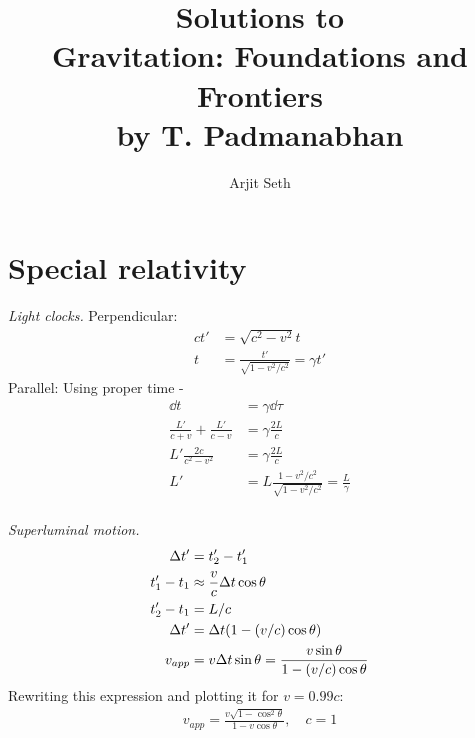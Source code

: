 \documentclass{report}
\begin{document}
\title{Solutions to \\ Gravitation: Foundations and Frontiers \\ by T. Padmanabhan}

\author{Arjit Seth}
\date{}

\maketitle

\chapter{Special relativity}


\begin{subquests}
	\item \emph{Light clocks.}
	Perpendicular:
	\begin{align*}
		ct' & = \sqrt{c^2 - v^2}t \\
		t & = \frac{t'}{\sqrt{1 - v^2/c^2}} = \gamma t'
	\end{align*}
	Parallel: Using proper time -
	\begin{align*}
		\dd{t} & = \gamma\dd{\tau} \\ 
		\frac{L'}{c+v} + \frac{L'}{c-v}  & = \gamma\frac{2L}{c} \\
		L'\frac{2c}{c^2 - v^2} & = \gamma\frac{2L}{c} \\
		L' & = L \frac{1-v^2/c^2}{\sqrt{1-v^2/c^2}} = \frac{L}{\gamma} \\
	\end{align*}

	\item \emph{Superluminal motion.}
	\begin{align*}
		\Delta t' & = t_2' - t_1' \\
		t_1' - t_1 & \approx \frac{v}{c}\Delta t \cos\theta \\
		t_2' - t_1 & = L/c \\
		\Delta t' & = \Delta t\pqty{1-(v/c)\cos\theta} \\
		v_{app} & = v\Delta t \sin\theta = \frac{v\sin\theta}{1-(v/c)\cos\theta}
	\end{align*}
	Rewriting this expression and plotting it for $v = 0.99 c$:
	\begin{align*}
		v_{app} = \frac{v\sqrt{1 - \cos^2 \theta}}{1-v\cos\theta}, \quad c = 1
	\end{align*}


\end{subquests}
\end{document}
